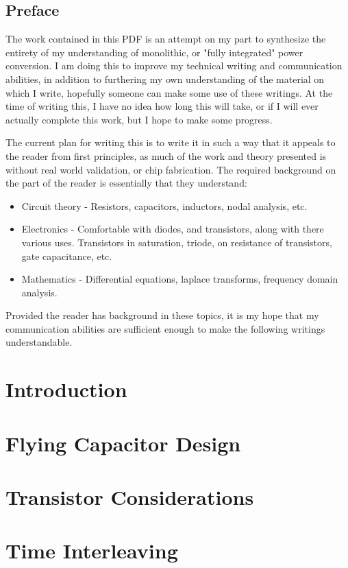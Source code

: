 \documentclass{report}
\begin{document}
	\tableofcontents
	\section*{Preface}
	The work contained in this PDF is an attempt on my part to synthesize the entirety of my understanding of monolithic, or "fully integrated" power conversion. I am doing this to improve my technical writing and communication abilities, in addition to furthering my own understanding of the material on which I write, hopefully someone can make some use of these writings. At the time of writing this, I have no idea how long this will take, or if I will ever actually complete this work, but I hope to make some progress.
	
	The current plan for writing this is to write it in such a way that it appeals to the reader from first principles, as much of the work and theory presented is without real world validation, or chip fabrication. The required background on the part of the reader is essentially that they understand:
	\begin{itemize}
		\item Circuit theory - Resistors, capacitors, inductors, nodal analysis, etc.
		\item Electronics - Comfortable with diodes, and transistors, along with there various uses. Transistors in saturation, triode, on resistance of transistors, gate capacitance, etc.
		\item Mathematics - Differential equations, laplace transforms, frequency domain analysis.
	\end{itemize}
	Provided the reader has background in these topics, it is my hope that my communication abilities are sufficient enough to make the following writings understandable.
	   
	\chapter{Introduction}
	
	
		
	
	\chapter{Flying Capacitor Design}
	\label{CH:FlyingCap}
	\chapter{Transistor Considerations}
	\chapter{Time Interleaving}
\end{document}

